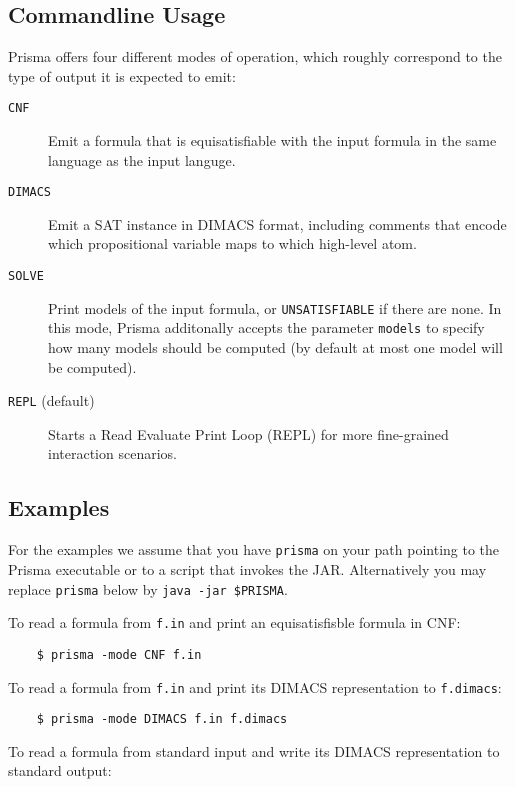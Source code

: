 \documentclass{llncs}
\begin{document}
\begin{enumerate}
\section{Commandline Usage}
\label{sec:usage}

Prisma offers four different modes of operation, which roughly correspond to the type of output it is expected to emit:

\begin{description}
	\item[\texttt{CNF}]{Emit a formula that is equisatisfiable with the input formula in the same language as the input languge.}
	\item[\texttt{DIMACS}]{Emit a SAT instance in DIMACS format, including comments that encode which propositional variable maps to which high-level atom.}
	\item[\texttt{SOLVE}]{Print models of the input formula, or \texttt{UNSATISFIABLE} if there are none. In this mode, Prisma additonally accepts the parameter \texttt{models} to specify how many models should be computed (by default at most one model will be computed).}
	\item[\texttt{REPL} \textnormal{(default)}]{Starts a Read Evaluate Print Loop (REPL) for more fine-grained interaction scenarios.}
\end{description}

\subsection{Examples}

For the examples we assume that you have \texttt{prisma} on your path pointing to the Prisma executable or to a script that invokes the JAR. Alternatively you may replace \texttt{prisma} below by \texttt{java -jar \$PRISMA}.

To read a formula from \texttt{f.in} and print an equisatisfisble formula in CNF:

	\begin{verbatim}
	$ prisma -mode CNF f.in
	\end{verbatim}

To read a formula from \texttt{f.in} and print its DIMACS representation to \texttt{f.dimacs}:

	\begin{verbatim}
	$ prisma -mode DIMACS f.in f.dimacs
	\end{verbatim}


To read a formula from standard input and write its DIMACS representation to standard output:


\end{enumerate}
\end{document}
